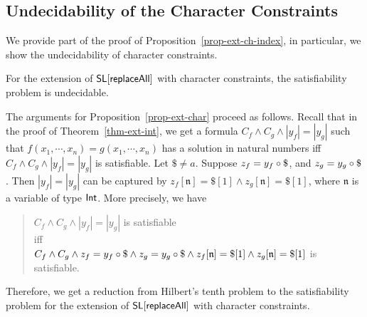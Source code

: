 
\subsection{Undecidability of the Character Constraints}

We provide part of the proof of Proposition~\ref{prop-ext-ch-index}, in particular, we show the undecidability of character constraints.

\begin{proposition}\label{prop-ext-char}
	For the extension of $\mathsf{SL}[\mathsf{replaceAll}]$ with character constraints, the satisfiability problem is undecidable. 
\end{proposition}

The arguments for Proposition~\ref{prop-ext-char} proceed as follows. Recall that in the proof of Theorem~\ref{thm-ext-int}, we get a formula $C_f \wedge C_g \wedge |y_f| = |y_g|$ such that $f(x_1,\cdots, x_n) = g(x_1,\cdots, x_n)$ has a solution in natural numbers iff $C_f \wedge C_g \wedge |y_f| = |y_g|$ is satisfiable. Let $\$ \neq a$. Suppose  $z_f = y_f \concat \$$, and $z_g = y_g \concat \$$. Then $|y_f| = |y_g|$ can be captured by $z_f[\mathfrak{n}] = \$[1] \wedge  z_g[\mathfrak{n}] = \$[1]$, where $\mathfrak{n}$ is a variable of type ${\sf Int}$. More precisely, 
%
we have 
\begin{quote}
	\centering
	$C_f \wedge C_g \wedge |y_f|= |y_g|$ is satisfiable \\
	iff \\
	$C_f \wedge C_g \wedge z_f = y_f \circ \$ \wedge z_g = y_g \circ \$ \wedge z_f[\mathfrak{n}] = \$[1] \wedge  z_g[\mathfrak{n}] = \$[1]$ is satisfiable. 
\end{quote}
Therefore, we get a reduction from Hilbert's tenth problem to the satisfiability problem for the extension of $\mathsf{SL}[\mathsf{replaceAll}]$ with character constraints. 


